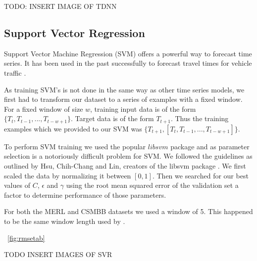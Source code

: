 TODO: INSERT IMAGE OF TDNN

\subsection{Support Vector Regression}
Support Vector Machine Regression (SVM) offers a powerful way to forecast time series.  It has been used in the past successfully to forecast travel times for vehicle traffic \cite{Wu2004}.  

As training SVM's is not done in the same way as other time series models, we first had to transform our dataset to a series of examples with a fixed window.  For a fixed window of size $w$, training input data is of the form $\{T_{t}, T_{t - 1}, ..., T_{t - w + 1}\}$.  Target data is of the form $T_{t + 1}$.  Thus the training examples which we provided to our SVM was $\{T_{t + 1}, [T_{t}, T_{t - 1}, ..., T_{t - w + 1}]\}$.

To perform SVM training we used the popular $libsvm$ package and as parameter selection is a notoriously difficult problem for SVM.  We followed the guidelines as outlined by Hsu, Chih-Chang and Lin, creators of the libsvm package \cite{Hsu2003}.  We first scaled the data by normalizing it between $[0, 1]$.  Then we searched for our best values of $C$, $\epsilon$ and $\gamma$ using the root mean squared error of the validation set a factor to determine performance of those parameters. 

For both the MERL and CSMBB datasets we used a window of 5.  This happened to be the same window length used by \cite{Wu2004}.

~\ref{fig:rmsetab}

TODO INSERT IMAGES OF SVR
